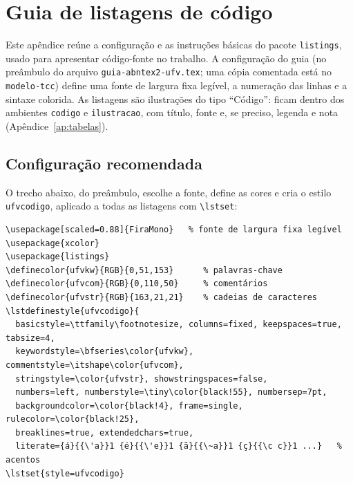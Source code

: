 


\chapter{Guia de listagens de código}\label{ap:listagens}

Este apêndice reúne a configuração e as instruções básicas do pacote \texttt{listings},
usado para apresentar código-fonte no trabalho. A configuração do guia (no preâmbulo do
arquivo \texttt{guia-abntex2-ufv.tex}; uma cópia comentada está no \texttt{modelo-tcc})
define uma fonte de largura fixa legível, a numeração das linhas e a sintaxe colorida. As
listagens são ilustrações do tipo ``Código'': ficam dentro dos ambientes \texttt{codigo} e
\texttt{ilustracao}, com título, fonte e, se preciso, legenda e nota
(Apêndice~\ref{ap:tabelas}).

\section{Configuração recomendada}\label{sec:lst-config}

O trecho abaixo, do preâmbulo, escolhe a fonte, define as cores e cria o estilo
\texttt{ufvcodigo}, aplicado a todas as listagens com \texttt{\textbackslash lstset}:

\begin{lstlisting}[style=exemplo, language={[LaTeX]TeX}]
\usepackage[scaled=0.88]{FiraMono}   % fonte de largura fixa legível
\usepackage{xcolor}
\usepackage{listings}
\definecolor{ufvkw}{RGB}{0,51,153}      % palavras-chave
\definecolor{ufvcom}{RGB}{0,110,50}     % comentários
\definecolor{ufvstr}{RGB}{163,21,21}    % cadeias de caracteres
\lstdefinestyle{ufvcodigo}{
  basicstyle=\ttfamily\footnotesize, columns=fixed, keepspaces=true, tabsize=4,
  keywordstyle=\bfseries\color{ufvkw}, commentstyle=\itshape\color{ufvcom},
  stringstyle=\color{ufvstr}, showstringspaces=false,
  numbers=left, numberstyle=\tiny\color{black!55}, numbersep=7pt,
  backgroundcolor=\color{black!4}, frame=single, rulecolor=\color{black!25},
  breaklines=true, extendedchars=true,
  literate={á}{{\'a}}1 {é}{{\'e}}1 {ã}{{\~a}}1 {ç}{{\c c}}1 ...}   % acentos
\lstset{style=ufvcodigo}
\end{lstlisting}

